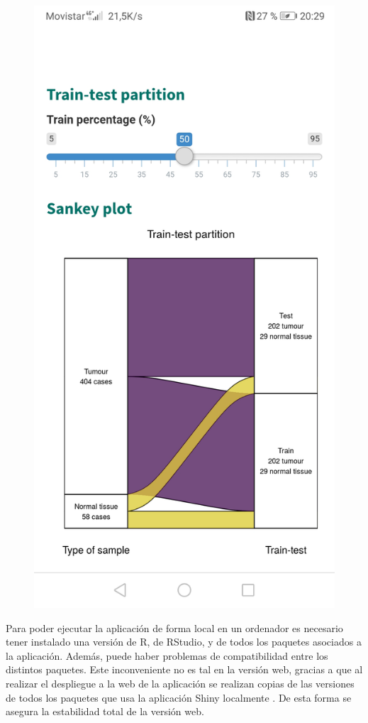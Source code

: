 \begin{center}
\begin{figure}[H]
\begin{minipage}{.5\textwidth}
		\end{minipage}%
		\begin{minipage}{.5\textwidth}
			\centering			\includegraphics[width=.825\textwidth]{figuras/52_app_huawei.jpg}
		\end{minipage}
	\end{figure}
\end{center}

Para poder ejecutar la aplicación de forma local en un ordenador es necesario tener instalado una versión de R, de RStudio, y de todos los paquetes asociados a la aplicación. Además, puede haber problemas de compatibilidad entre los distintos paquetes. Este inconveniente no es tal en la versión web, gracias a que al realizar el despliegue a la web de la aplicación se realizan copias de las versiones de todos los paquetes que usa la aplicación Shiny localmente \cite{Shinyapps.ioteam2020}. De esta forma se asegura la estabilidad total de la versión web.\\

